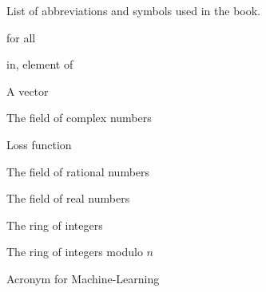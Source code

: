%
%


List of abbreviations and symbols used in the book.

\begin{description}[CABR]
\item[$\forall$]{for all}
\item[$\in$]{in, element of}
\item[$\vec{v}$]{A vector}
\item[$\mathbb{C}$]{The field of complex numbers}
\item[$\loss$]{Loss function} 
\item[$\mathbb{Q}$]{The field of rational numbers} 
\item[$\mathbb{R}$]{The field of real numbers}
\item[$\mathbb{Z}$]{The ring of integers}
\item[$\mathbb{Z}/n\mathbb{Z}$]{The ring of integers modulo $n$}
\item[ML]{Acronym for Machine-Learning}
\end{description}